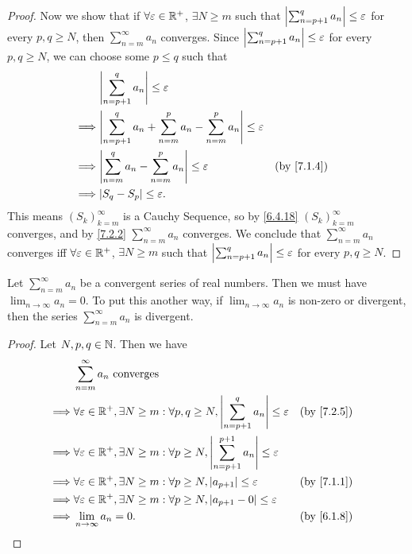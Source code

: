 \begin{proof}
  Now we show that if \(\forall \varepsilon \in \mathbb{R}^+\), \(\exists N \geq m\) such that \(\left\lvert\sum_{n = p + 1}^q a_n\right\rvert \leq \varepsilon\) for every \(p, q \geq N\), then \(\sum_{n = m}^\infty a_n\) converges.
  Since \(\left\lvert\sum_{n = p + 1}^q a_n\right\rvert \leq \varepsilon\) for every \(p, q \geq N\), we can choose some \(p \leq q\) such that
  \begin{align*}
             & \abs{\sum_{n = p + 1}^q a_n} \leq \varepsilon                                                           \\
    \implies & \abs{\sum_{n = p + 1}^q a_n + \sum_{n = m}^p a_n - \sum_{n = m}^p a_n} \leq \varepsilon                 \\
    \implies & \abs{\sum_{n = m}^q a_n - \sum_{n = m}^p a_n} \leq \varepsilon                          &  & \by{7.1.4} \\
    \implies & \abs{S_q - S_p} \leq \varepsilon.
  \end{align*}
  This means \((S_k)_{k = m}^\infty\) is a Cauchy Sequence, so by \cref{6.4.18} \((S_k)_{k = m}^\infty\) converges, and by \cref{7.2.2} \(\sum_{n = m}^\infty a_n\) converges.
  We conclude that \(\sum_{n = m}^\infty a_n\) converges iff \(\forall \varepsilon \in \mathbb{R}^+\), \(\exists N \geq m\) such that \(\left\lvert\sum_{n = p + 1}^q a_n\right\rvert \leq \varepsilon\) for every \(p, q \geq N\).
\end{proof}

\begin{cor}\label{7.2.6}
  Let \(\sum_{n = m}^\infty a_n\) be a convergent series of real numbers.
  Then we must have \(\lim_{n \to \infty} a_n = 0\).
  To put this another way, if \(\lim_{n \to \infty} a_n\) is non-zero or divergent, then the series \(\sum_{n = m}^\infty a_n\) is divergent.
\end{cor}

\begin{proof}
  Let \(N, p, q \in \mathbb{N}\).
  Then we have
  \begin{align*}
             & \sum_{n = m}^\infty a_n \text{ converges}                                                                                              \\
    \implies & \forall \varepsilon \in \R^+, \exists N \geq m : \forall p, q \geq N, \abs{\sum_{n = p + 1}^q a_n} \leq \varepsilon    &  & \by{7.2.5} \\
    \implies & \forall \varepsilon \in \R^+, \exists N \geq m : \forall p \geq N, \abs{\sum_{n = p + 1}^{p + 1} a_n} \leq \varepsilon                 \\
    \implies & \forall \varepsilon \in \R^+, \exists N \geq m : \forall p \geq N, \abs{a_{p + 1}} \leq \varepsilon                    &  & \by{7.1.1} \\
    \implies & \forall \varepsilon \in \R^+, \exists N \geq m : \forall p \geq N, \abs{a_{p + 1} - 0} \leq \varepsilon                                \\
    \implies & \lim_{n \to \infty} a_n = 0.                                                                                           &  & \by{6.1.8}
  \end{align*}
\end{proof}

